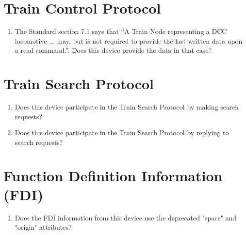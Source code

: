 \section{Train Control Protocol}
    \begin{enumerate}
        \item The Standard section 7.1 says that
            ``A Train Node representing a DCC locomotive ... may, 
            but is not required to provide the last written data upon a read command.''.
            Does this device provide the data in that case?
    \end{enumerate}

\section{Train Search Protocol}
    \begin{enumerate}
        \item Does this device participate in the Train Search Protocol
            by making search requests?
        \item Does this device participate in the Train Search Protocol
            by replying to search requests?
    \end{enumerate}

\section{Function Definition Information (FDI)}
    \begin{enumerate}
        \item Does the FDI information from this device use the 
            deprecated "space" and "origin" attributes?
    \end{enumerate}


  
